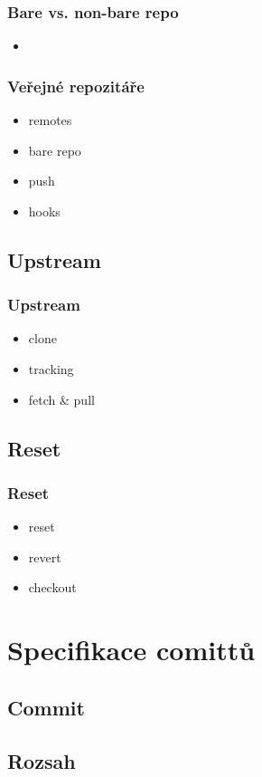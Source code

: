 \documentclass[pdftex]{beamer}
\begin{document}
\begin{frame}
	\frametitle{Bare vs. non-bare repo}
	\begin{itemize}
		\item 
	\end{itemize}
\end{frame}

\begin{frame}
	\frametitle{Veřejné repozitáře}
	\begin{itemize}
		\item remotes
		\item bare repo
		\item push
		\item hooks
	\end{itemize}
\end{frame}

\subsection{Upstream}

\begin{frame}
	\frametitle{Upstream}
	\begin{itemize}
		\item clone
		\item tracking
		\item fetch \& pull
	\end{itemize}
\end{frame}

\subsection{Reset}

\begin{frame}
	\frametitle{Reset}
	\begin{itemize}
		\item reset
		\item revert
		\item checkout
	\end{itemize}
\end{frame}

\section{Specifikace comittů}
\subsection{Commit}
\subsection{Rozsah}
\end{document}
